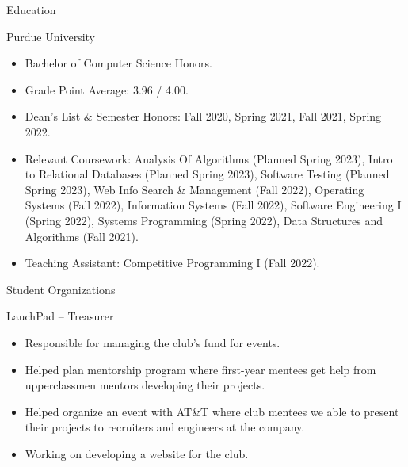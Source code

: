 \documentclass{article}
\newlength{\tabin}
\newlength{\secsep}
\newcommand{\lineunder}{\vspace*{-8pt} \\ \hspace*{-6pt} \hrulefill \\ \vspace*{-15pt}}
\newenvironment{tabbedsection}[1]{
  \begin{list}{}{
      \setlength{\itemsep}{0pt}
      \setlength{\labelsep}{0pt}
      \setlength{\labelwidth}{0pt}
      \setlength{\leftmargin}{\tabin}
      \setlength{\rightmargin}{\tabin}
      \setlength{\listparindent}{0pt}
      \setlength{\parsep}{0pt}
      \setlength{\parskip}{0pt}
      \setlength{\partopsep}{0pt}
      \setlength{\topsep}{#1}
    }
  \item[]
}{\end{list}}
\newenvironment{resume_section}[1]{
  \filbreak
  \vspace{2\secsep}
  \textsc{\large#1}
  \lineunder
  \begin{tabbedsection}{\secsep}
}{\end{tabbedsection}}
\newenvironment{resume_subsection}[2][]{
  \textbf{#2} \hfill {\footnotesize #1} \hspace{2em}
  \begin{tabbedsection}{0.5\secsep}
}{\end{tabbedsection}}
\newenvironment{subitems}{
  \renewcommand{\labelitemi}{-}
  \begin{itemize}
      \setlength{\labelsep}{1em}
}{\end{itemize}}
\begin{document}
\begin{resume_section}{Education}
  
  \begin{resume_subsection}{Purdue University}
    
    \begin{subitems}
      \item Bachelor of Computer Science Honors.
      \item Grade Point Average: 3.96 / 4.00.  	
  	  \item Dean's List \& Semester Honors: Fall 2020, Spring 2021, Fall 2021, Spring 2022.
  	  \item Relevant Coursework: Analysis Of Algorithms (Planned Spring 2023), Intro to Relational Databases (Planned Spring 2023), Software Testing (Planned Spring 2023), Web Info Search \& Management (Fall 2022), Operating Systems (Fall 2022), Information Systems (Fall 2022), Software Engineering I (Spring 2022), Systems Programming (Spring 2022), Data Structures and Algorithms (Fall 2021).
  	  \item Teaching Assistant: Competitive Programming I (Fall 2022).
	\end{subitems}  	
  	
  \end{resume_subsection}
  
\end{resume_section}


\begin{resume_section}{Student Organizations}

\begin{resume_subsection}{LauchPad -- Treasurer}

    \begin{subitems}
		\item Responsible for managing the club's fund for events.
		\item Helped plan mentorship program where first-year mentees get help from upperclassmen mentors developing their projects.
		\item Helped organize an event with AT\&T where club mentees we able to present their projects to recruiters and engineers at the company.
		\item Working on developing a website for the club.
	\end{subitems}  

\end{resume_subsection}
	
	
\end{resume_section}
\end{document}
